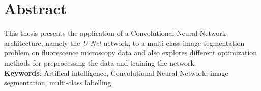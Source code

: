 \chapter*{Abstract}

\noindent This thesis presents the application of a Convolutional Neural Network architecture, namely the \textit{U-Net} network, to a multi-class image segmentation problem on fluorescence microscopy data and also explores different optimization methods for preprocessing the data and training the network.\\

\noindent \textbf{Keywords}: Artifical intelligence, Convolutional Neural Network, image segmentation, multi-class labelling